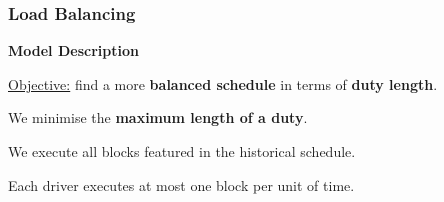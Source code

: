 \documentclass[handout]{beamer}
\begin{document}
\begin{frame}

	\frametitle{Load Balancing}
	
\vspace{\baselineskip}
			
		    \textbf{Model Description}
		    
			\begin{itemize}
				\small{\item \underline{Objective:} find a more \textbf{balanced schedule} in terms of \textbf{duty length}.}
				\item We minimise the \textbf{maximum length of a duty}.
				\item We execute all blocks featured in the historical schedule.
				\item Each driver executes at most one block per unit of time.
			\end{itemize}	
			
			\vspace{\baselineskip}
			\centering

\end{frame}

\end{document}
